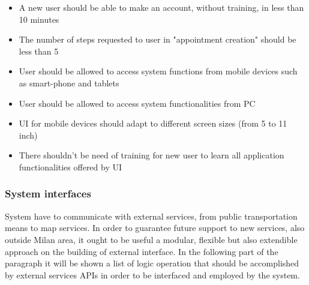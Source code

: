 \begin{itemize}
	\item A new user should be able to make an account, without training, in less than 10 minutes
	\item The number of steps requested to user in "appointment creation" should be less than 5
	\item User should be allowed to access system functions from mobile devices such as smart-phone and tablets
	\item User should be allowed to access system functionalities from PC
	\item UI for mobile devices should adapt to different screen sizes (from 5 to 11 inch)
	\item There shouldn't be need of training for new user to learn all application functionalities offered by UI
\end{itemize}
\subsubsection{System interfaces}

System have to communicate with external services, from public transportation means to map services. In order to guarantee future support to new services, also outside Milan area, it ought to be useful a modular, flexible but also extendible approach on the building of external interface. In the following part of the paragraph it will be shown a list of logic operation that should be accomplished by external services APIs in order to be interfaced and employed by the system.

